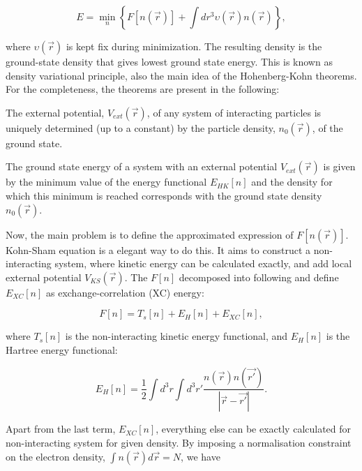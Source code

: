 \begin{equation}
E=\min_n \left\lbrace F[n(\vec{r})] + \int dr^3\upsilon(\vec{r})n(\vec{r}) \right\rbrace,
\end{equation}

where $\upsilon(\vec{r})$ is kept fix during minimization. The resulting density is the ground-state density that gives lowest ground state energy. This is known as density variational principle, also the main idea of the Hohenberg-Kohn theorems. For the completeness, the theorems are present in the following:

\begin{theorem}

The external potential, $V_{ext}(\vec{r})$, of any system of interacting particles is uniquely determined (up to a constant) by the particle density, $n_0(\vec{r})$, of the ground state.

\end{theorem}

\begin{theorem}

The ground state energy of a system with an external potential $V_{ext}(\vec{r})$ is given by the minimum value of the energy functional $E_{HK} [n]$ and the density for which this minimum is reached corresponds with the ground state density $n_0(\vec{r})$.

\end{theorem}

Now, the main problem is to define the approximated expression of $F[n(\vec{r})]$. Kohn-Sham equation is a elegant way to do this. It aims to construct a non-interacting system, where kinetic energy can be calculated exactly, and add local external potential $V_{KS}(\vec{r})$. The $F[n]$ decomposed into following and define $E_{XC}[n]$ as exchange-correlation (XC) energy:

\begin{equation}
F[n]=T_s[n]+E_H[n]+E_{XC}[n],
\end{equation}

where $T_s[n]$ is the non-interacting kinetic energy functional, and $E_H[n]$ is the Hartree energy functional:

\begin{equation}
E_H[n]=\frac{1}{2}\int d^3r\int d^3r\prime\frac{n(\vec{r})n(\vec{r\prime})}{|\vec{r}-\vec{r\prime}|}.
\end{equation}

Apart from the last term, $E_{XC}[n]$, everything else can be exactly calculated for non-interacting system for given density. By imposing a normalisation constraint on the electron density, $\int n(\vec{r})d\vec{r}=N$, we have

